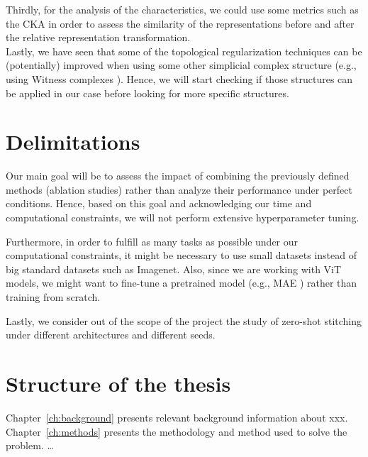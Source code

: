 \documentclass[../main.tex]{subfiles}
\begin{document}
Thirdly, for the analysis of the characteristics, we could use some metrics such as the CKA \cite{kornblith_similarity_2019} in order to assess the similarity of the representations before and after the relative representation transformation.\\

Lastly, we have seen that some of the topological regularization techniques can be (potentially) improved when using some other simplicial complex structure (e.g., using Witness complexes \cite{schonenberger_witness_2022}). Hence, we will start checking if those structures can be applied in our case before looking for more specific structures.

\section{Delimitations}

Our main goal will be to assess the impact of combining the previously defined methods (ablation studies) rather than analyze their performance under perfect conditions. Hence, based on this goal and acknowledging our time and computational constraints, we will not perform extensive hyperparameter tuning. 


Furthermore, in order to fulfill as many tasks as possible under our computational constraints, it might be necessary to use small datasets instead of big standard datasets such as Imagenet. Also, since we are working with ViT models, we might want to fine-tune a pretrained model (e.g., MAE \cite{he_masked_2021}) rather than training from scratch.

Lastly, we consider out of the scope of the project the study of zero-shot stitching under different architectures and different seeds.


\section{Structure of the thesis}
Chapter~\ref{ch:background} presents relevant background information about xxx.  Chapter~\ref{ch:methods} presents the methodology and method used to solve the problem. …
\end{document}
